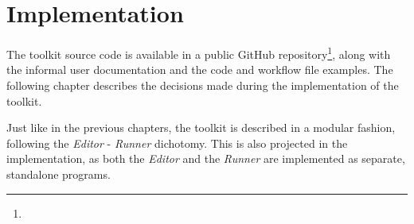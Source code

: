 \chapter{Implementation}

The toolkit source code is available in a public GitHub repository\footnote{\githubInfo},
along with the informal user documentation and the code and workflow file examples.
The following chapter describes the decisions made during the implementation of the toolkit.

Just like in the previous chapters, the toolkit is described in a modular fashion, following the \textit{Editor} - \textit{Runner} dichotomy.
This is also projected in the implementation, as both the \textit{Editor} and the \textit{Runner} are implemented as separate, standalone programs.




